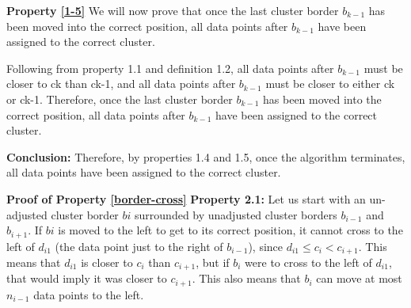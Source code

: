 \documentclass[conference,compsoc]{IEEEtran}
\newtheorem{proofprp}{}
\newtheorem{subprp}{Property}[proofprp]
\begin{document}
\textbf{Property \ref{1-5}}
We will now prove that once the last cluster border $b_{k-1}$ has been moved into the correct position, all data points after $b_{k-1}$ have been assigned to the correct cluster.

Following from property 1.1 and definition 1.2, all data points after $b_{k-1}$ must be closer to ck than ck-1, and all data points after $b_{k-1}$ must be closer to either ck or ck-1. Therefore, once the last cluster border $b_{k-1}$ has been moved into the correct position, all data points after $b_{k-1}$ have been assigned to the correct cluster.

\textbf{Conclusion:}
Therefore, by properties 1.4 and 1.5, once the algorithm terminates, all data points have been assigned to the correct cluster.


\noindent{}
\vspace{15px}


\textbf{Proof of Property \ref{border-cross}}
\textbf{Property 2.1:}
Let us start with an un-adjusted cluster border $bi$ surrounded by unadjusted cluster borders $b_{i-1}$ and $b_{i+1}$.
If $bi$ is moved to the left to get to its correct position, it cannot cross to the left of $d_{i1}$ (the data point just to the right of $b_{i-1}$), since $d_{i1} \leq c_i < c_{i+1}$.
This means that $d_{i1}$ is closer to $c_i$ than $c_{i+1}$, but if $b_i$ were to cross to the left of $d_{i1}$, that would imply it was closer to $c_{i+1}$.
This also means that $b_i$ can move at most $n_{i-1}$ data points to the left.
\end{document}
